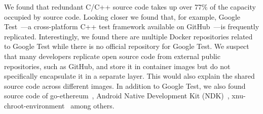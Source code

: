 We found that redundant C/C++ source code takes up over 77\% of the capacity
occupied by source code.
%
Looking closer we found that, for example, Google Test~\cite{googletest}---a
cross-platform C++ test framework available on GitHub~\cite{github}---is
frequently replicated.
%
Interestingly, we found there are multiple Docker repositories related to
Google Test while there is no official repository for Google Test.
%
We suspect that many developers replicate open source code from external public
repositories, such as GitHub, and store it in container images but do not
specifically encapsulate it in a separate layer.
%
This would also explain the shared source code across different images.
%
% 
In addition to Google Test, we also found source code of
go-ethereum~\cite{go-ethereum}, Android Native Development Kit (NDK)~\cite{NDK},
xnu-chroot-environment~\cite{xnu-chroot-environment} among others.
%
%
%


